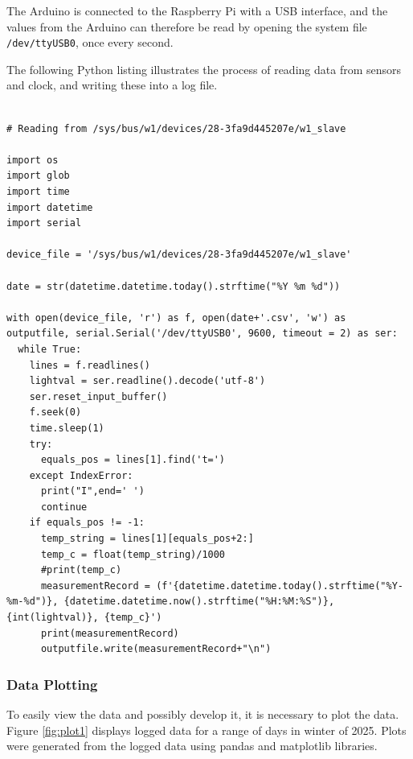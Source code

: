 \documentclass[a4paper,12pt]{article}
\begin{document}
The Arduino is connected to the Raspberry Pi with a USB interface, and the values from the Arduino can
therefore be read by opening the system file \verb|/dev/ttyUSB0|, once every second.

The following Python listing illustrates the process of reading data from sensors and clock,
and writing these into a log file.

\begin{listing}
\begin{verbatim}
    
# Reading from /sys/bus/w1/devices/28-3fa9d445207e/w1_slave

import os
import glob
import time
import datetime
import serial

device_file = '/sys/bus/w1/devices/28-3fa9d445207e/w1_slave' 

date = str(datetime.datetime.today().strftime("%Y %m %d"))

with open(device_file, 'r') as f, open(date+'.csv', 'w') as outputfile, serial.Serial('/dev/ttyUSB0', 9600, timeout = 2) as ser:
  while True:
    lines = f.readlines()
    lightval = ser.readline().decode('utf-8')
    ser.reset_input_buffer()
    f.seek(0)
    time.sleep(1)
    try:
      equals_pos = lines[1].find('t=')
    except IndexError:
      print("I",end=' ')
      continue
    if equals_pos != -1:
      temp_string = lines[1][equals_pos+2:]
      temp_c = float(temp_string)/1000
      #print(temp_c)
      measurementRecord = (f'{datetime.datetime.today().strftime("%Y-%m-%d")}, {datetime.datetime.now().strftime("%H:%M:%S")}, {int(lightval)}, {temp_c}')
      print(measurementRecord)
      outputfile.write(measurementRecord+"\n")

\end{verbatim}
\end{listing}

\subsubsection{Data Plotting}


To easily view the data and possibly develop it, it is necessary to plot the data. 
Figure \ref{fig:plot1} displays logged data for a range of days in winter of 2025.
Plots were generated from the logged data using pandas and matplotlib libraries.
\end{document}
